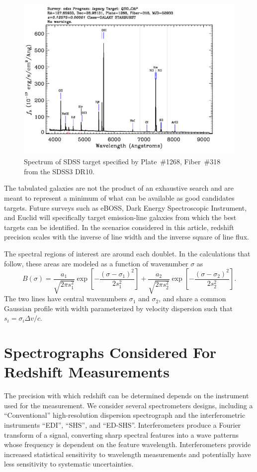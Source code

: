 \documentclass[preprint]{aastex}
\begin{document}
\begin{figure}[t]
   \centering
    \includegraphics[scale=0.4]{SpecById.pdf} 
   \caption{Spectrum of SDSS target specified by Plate~\#1268, Fiber~\#318 from the SDSS3 DR10.  \label{shsinput:fig}}
\end{figure}

The tabulated galaxies are not the product of an exhaustive search and are meant to represent a minimum of what can be available
as good
candidates targets.
Future surveys such as eBOSS, Dark Energy Spectroscopic Instrument, and Euclid will specifically target emission-line
galaxies from which the best targets can be identified.  In the scenarios considered in this article, redshift precision scales
with the inverse of line width and the inverse square of line flux.

The spectral regions of interest
are around each doublet.  In the calculations that follow, these areas are modeled as a function of wavenumber $\sigma$ as
\begin{equation}
B(\sigma)=\frac{a_1}{\sqrt{2\pi s_1^2}}\exp{\left[-\frac{\left(\sigma-\sigma_1\right)^2}{2s_1^2}\right]}+\frac{a_2}{\sqrt{2\pi s_2^2}}\exp{\left[-\frac{\left(\sigma-\sigma_2\right)^2}{2s_2^2}\right]}.
\label{input:eqn}
\end{equation}
The two lines have central wavenumbers $\sigma_1$ and $\sigma_2$, and share a common Gaussian profile with width parameterized by velocity dispersion
such that $s_i=\sigma_i\Delta v/c$. 

\section{Spectrographs Considered For Redshift Measurements}
The precision with which redshift can be determined depends on the instrument used for the measurement.
We consider several spectrometers designs, including a ``Conventional'' high-resolution dispersion spectrograph and the
interferometric instruments ``EDI'',
``SHS'', and ``ED-SHS''.  Interferometers produce a Fourier transform of a signal, converting sharp
spectral features into a wave patterns whose frequency is dependent on the feature wavelength.  Interferometers provide
increased statistical sensitivity to wavelength measurements and potentially have less sensitivity to systematic
uncertainties.
\end{document}
